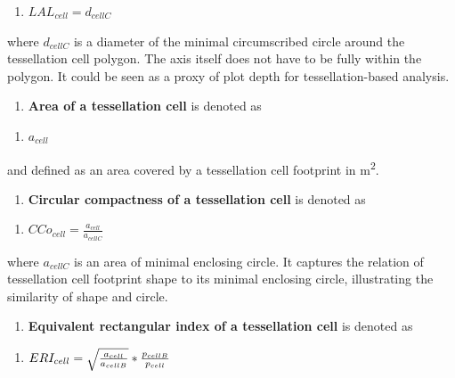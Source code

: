 \documentclass[
  letterpaper,
  DIV=11,
  numbers=noendperiod]{scrartcl}
\providecommand{\tightlist}{%
  \setlength{\itemsep}{0pt}\setlength{\parskip}{0pt}}\usepackage{longtable,booktabs,array}
\begin{document}
\begin{enumerate}
\def\labelenumi{(\arabic{enumi})}
\setcounter{enumi}{10}
\tightlist
\item
  \(LAL_{cell} = d_{cellC}\)
\end{enumerate}

where \(d_{cellC}\) is a diameter of the minimal circumscribed circle
around the tessellation cell polygon. The axis itself does not have to
be fully within the polygon. It could be seen as a proxy of plot depth
for tessellation-based analysis.

\begin{enumerate}
\def\labelenumi{\arabic{enumi}.}
\setcounter{enumi}{11}
\tightlist
\item
  \textbf{Area of a tessellation cell} is denoted as
\end{enumerate}

\begin{enumerate}
\def\labelenumi{(\arabic{enumi})}
\setcounter{enumi}{11}
\tightlist
\item
  \(a_{cell}\)
\end{enumerate}

and defined as an area covered by a tessellation cell footprint in
m\textsuperscript{2}.

\begin{enumerate}
\def\labelenumi{\arabic{enumi}.}
\setcounter{enumi}{12}
\tightlist
\item
  \textbf{Circular compactness of a tessellation cell} is denoted as
\end{enumerate}

\begin{enumerate}
\def\labelenumi{(\arabic{enumi})}
\setcounter{enumi}{12}
\tightlist
\item
  \(CCo_{cell} = \frac{a_{cell}}{a_{cellC}}\)
\end{enumerate}

where \(a_{cellC}\) is an area of minimal enclosing circle. It captures
the relation of tessellation cell footprint shape to its minimal
enclosing circle, illustrating the similarity of shape and circle.

\begin{enumerate}
\def\labelenumi{\arabic{enumi}.}
\setcounter{enumi}{13}
\tightlist
\item
  \textbf{Equivalent rectangular index of a tessellation cell} is
  denoted as
\end{enumerate}

\begin{enumerate}
\def\labelenumi{(\arabic{enumi})}
\setcounter{enumi}{13}
\tightlist
\item
  \(ERI_{cell} =  \sqrt{{a_{cell}} \over {a_{cellB}}} * {p_{cellB} \over p_{cell}}\)
\end{enumerate}
\end{document}
